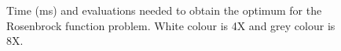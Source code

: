 \documentclass[final,1p,times]{elsarticle}
\begin{document}
\begin{figure}[htb]
\caption{Time (ms) and evaluations needed to obtain the optimum for the
  Rosenbrock function problem. White colour is 4X and grey colour is 8X.}

\label{fig:boxplotsROSENBROCK}
\end{figure}




\end{document}

